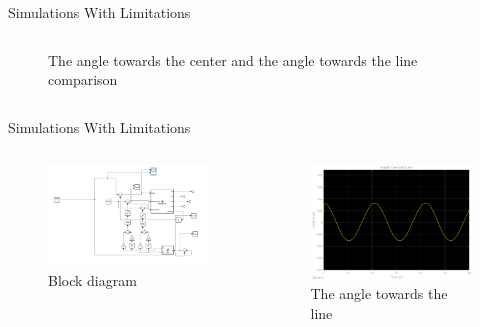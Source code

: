 \documentclass{beamer}
\begin{document}
\begin{frame}{Simulations With Limitations}
\begin{columns}
\begin{column}[]{0.5\textwidth}
\begin{figure}
    \caption{The angle towards the center and the angle towards the line comparison}
    \label{fig:my_label}
\end{figure}
\end{column}
\end{columns}
    
\end{frame}






\begin{frame}{Simulations With Limitations}

\begin{columns}
\begin{column}[]{0.5\textwidth}
\begin{figure}
    \centering
    \includegraphics[width=\textwidth]{img/pd_block_diagram.png}
    \caption{Block diagram}
    \label{fig:my_label}
\end{figure}
\end{column}
\begin{column}[]{0.5\textwidth}
\begin{figure}
    \centering
    \includegraphics[width=\textwidth]{img/angle_towards_line.eps}
    \caption{The angle towards the line}
    \label{fig:my_label}
\end{figure}
\end{column}
\end{columns}
\end{frame}
\end{document}
